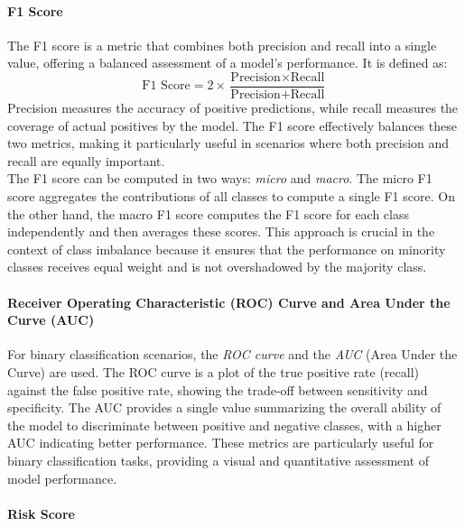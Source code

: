 \paragraph{F1 Score}
The F1 score is a metric that combines both precision and recall into a single value, offering a balanced assessment of a model's performance. It is defined as:
\[
    \text{F1 Score} = 2 \times \frac{\text{Precision} \times \text{Recall}}{\text{Precision} + \text{Recall}}
\]
Precision measures the accuracy of positive predictions, while recall measures the coverage of actual positives by the model.
The F1 score effectively balances these two metrics, making it particularly useful in scenarios where both precision and recall are equally important.\\
The F1 score can be computed in two ways: \textit{micro} and \textit{macro}.
The micro F1 score aggregates the contributions of all classes to compute a single F1 score.
On the other hand, the macro F1 score computes the F1 score for each class independently and then averages these scores. 
This approach is crucial in the context of
class imbalance because it ensures that the performance on minority classes receives equal weight and is not overshadowed by the majority class.

\paragraph{Receiver Operating Characteristic (ROC) Curve and Area Under the Curve (AUC)}
For binary classification scenarios, the \textit{ROC curve} and the \textit{AUC} (Area Under the Curve) are used.
The ROC curve is a plot of the true positive rate (recall) against the false positive rate, showing the trade-off between sensitivity and specificity.
The AUC provides a single value summarizing the overall ability of the model to discriminate between positive and negative classes,
with a higher AUC indicating better performance. These metrics are particularly useful for binary classification tasks,
providing a visual and quantitative assessment of model performance.

\paragraph{Risk Score}